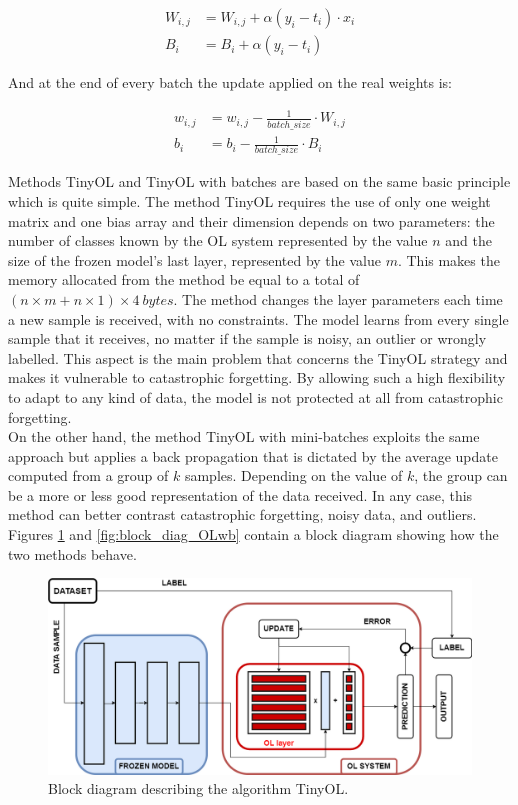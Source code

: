 \documentclass[12pt]{report}
\begin{document}
\begin{align}
	W_{i,j} &= W_{i,j} + \alpha (y_i - t_i) \cdot x_i \\
    B_i     &= B_i + \alpha  (y_i - t_i) 
\end{align}

And at the end of every batch the update applied on the real weights is:

\begin{align}
	w_{i,j} &= w_{i,j} - \frac{1}{batch\_size} \cdot W_{i,j} \\
	b_i     &= b_i - \frac{1}{batch\_size} \cdot B_i
\end{align}

Methods TinyOL and TinyOL with batches are based on the same basic principle which is quite simple. The method TinyOL requires the use of only one weight matrix and one bias array and their dimension depends on two parameters: the number of classes known by the OL system represented by the value $n$ and the size of the frozen model's last layer, represented by the value $m$. This makes the memory allocated from the method be equal to a total of $(n \times m+n \times 1)\times 4 \: bytes$. The method changes the layer parameters each time a new sample is received, with no constraints. The model learns from every single sample that it receives, no matter if the sample is noisy, an outlier or wrongly labelled. This aspect is the main problem that concerns the TinyOL strategy and makes it vulnerable to catastrophic forgetting. By allowing such a high flexibility to adapt to any kind of data, the model is not protected at all from catastrophic forgetting.\\
On the other hand, the method TinyOL with mini-batches exploits the same approach but applies a back propagation that is dictated by the average update computed from a group of $k$ samples. Depending on the value of $k$, the group can be a more or less good representation of the data received. In any case, this method can better contrast catastrophic forgetting, noisy data, and outliers. \\
Figures \ref{fig:block_diag_OL} and \ref{fig:block_diag_OLwb} contain a block diagram showing how the two methods behave.

\begin{figure}[h!]
    \centering
    \includegraphics[width=120mm]{Figures/Chapter3/OL.png} 
    \caption{Block diagram describing the algorithm TinyOL.}
    \label{fig:block_diag_OL}    
\end{figure}
\end{document}
